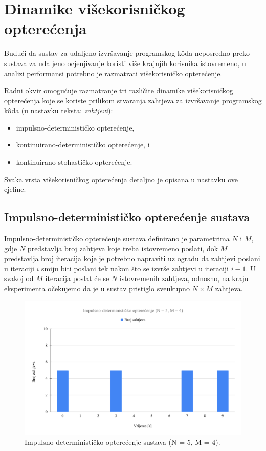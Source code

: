 \documentclass[times, utf8, diplomski]{fer}
\begin{document}
\section{Dinamike višekorisničkog opterećenja}
Budući da sustav za udaljeno izvršavanje programskog kôda neposredno preko sustava za udaljeno ocjenjivanje koristi više krajnjih korisnika istovremeno, u analizi performansi potrebno je razmatrati višekorisničko opterećenje.

Radni okvir omogućuje razmatranje tri različite dinamike višekorisničkog opterećenja koje se koriste prilikom stvaranja zahtjeva za izvršavanje programskog kôda (u nastavku teksta: \textit{zahtjevi}):
\begin{itemize}
    \item impulsno-determinističko opterećenje,
    \item kontinuirano-determinističko opterećenje, i
    \item kontinuirano-stohastičko opterećenje.
\end{itemize}

Svaka vrsta višekorisničkog opterećenja detaljno je opisana u nastavku ove cjeline. 

\subsection{Impulsno-determinističko opterećenje sustava}
\label{subsec:id-load}
Impulsno-determinističko opterećenje sustava definirano je parametrima $N$ i $M$, gdje $N$ predstavlja broj zahtjeva koje treba istovremeno poslati, dok $M$ predstavlja broj iteracija koje je potrebno napraviti uz ogradu da zahtjevi poslani u iteraciji $i$ smiju biti poslani tek nakon što se izvrše zahtjevi u iteraciji $i - 1$. U svakoj od $M$ iteracija poslat će se $N$ istovremenih zahtjeva, odnosno, na kraju eksperimenta očekujemo da je u sustav pristiglo sveukupno $N \times M$ zahtjeva.

\begin{figure}[htb]
	\centering
	\includegraphics[width=\textwidth]{images/Impulsno-deterministicko opterecenje (N = 5, M = 4).pdf}
	\caption{
		Impulsno-determinističko opterećenje sustava (N = 5, M = 4).
	}
	\label{fig:id-load}
\end{figure}
\end{document}
